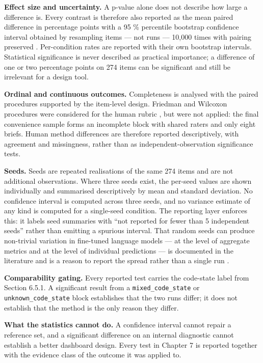 \textbf{Effect size and uncertainty.} A p-value alone does not describe how large a difference is. Every contrast is therefore also reported as the mean paired difference in percentage points with a 95 \% percentile bootstrap confidence interval obtained by resampling items --- not runs --- 10,000 times with pairing preserved \cite{efron1979bootstrap}. Per-condition rates are reported with their own bootstrap intervals. Statistical significance is never described as practical importance; a difference of one or two percentage points on 274 items can be significant and still be irrelevant for a design tool.

\textbf{Ordinal and continuous outcomes.} Completeness is analysed with the paired procedures supported by the item-level design. Friedman and Wilcoxon procedures were considered for the human rubric \cite{friedman1937,wilcoxon1945}, but were not applied: the final convenience sample forms an incomplete block with shared raters and only eight briefs. Human method differences are therefore reported descriptively, with agreement and missingness, rather than as independent-observation significance tests.

\textbf{Seeds.} Seeds are repeated realisations of the same 274 items and are not additional observations. Where three seeds exist, the per-seed values are shown individually and summarised descriptively by mean and standard deviation. No confidence interval is computed across three seeds, and no variance estimate of any kind is computed for a single-seed condition. The reporting layer enforces this: it labels seed summaries with ``not reported for fewer than 5 independent seeds'' rather than emitting a spurious interval. That random seeds can produce non-trivial variation in fine-tuned language models --- at the level of aggregate metrics and at the level of individual predictions --- is documented in the literature and is a reason to report the spread rather than a single run \cite{bui2025seeds}.

\textbf{Comparability gating.} Every reported test carries the code-state label from Section 6.5.1. A significant result from a \texttt{mixed\_code\_state} or \texttt{unknown\_code\_state} block establishes that the two runs differ; it does not establish that the method is the only reason they differ.

\textbf{What the statistics cannot do.} A confidence interval cannot repair a reference set, and a significant difference on an internal diagnostic cannot establish a better dashboard design. Every test in Chapter 7 is reported together with the evidence class of the outcome it was applied to.

